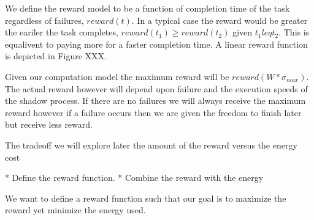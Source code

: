 We define the reward model to be a function of completion time of the
task regardless of failures, $reward(t)$. In a typical case the reward
would be greater the eariler the task completes, $reward(t_1) \geq
reward(t_2)$ given $t_1 leq t_2$. This is equalivent to paying more
for a faster completion time. A linear reward function is depicted in
Figure XXX.

Given our computation model the maximum reward will be
$reward(W*\sigma_{max})$. The actual reward however will depend upon
failure and the execution speeds of the shadow process. If there are
no failures we will always receive the maximum reward however if a
failure occurs then we are given the freedom to finish later but
receive less reward.


The tradeoff we will explore
later the amount of the reward versus the energy cost

* Define the reward function.
* Combine the reward with the energy

We want to define a reward function such that our goal is to maximize the reward yet minimize the energy used.
